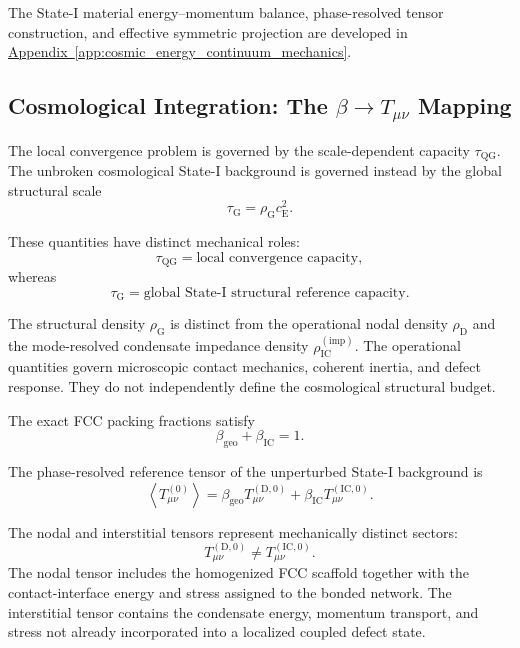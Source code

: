 The State-I material energy--momentum balance, phase-resolved tensor construction, and effective symmetric projection are developed in \hyperref[app:cosmic_energy_continuum_mechanics]{Appendix~\ref*{app:cosmic_energy_continuum_mechanics}}.

\subsection{Cosmological Integration: The \texorpdfstring{$\beta\rightarrow T_{\mu\nu}$}{beta->T\_mu\_nu} Mapping}
\label{sec:cosmological_integration}
The local convergence problem is governed by the scale-dependent capacity $\tau_{\mathrm{QG}}$. The unbroken cosmological State-I background is governed instead by the global structural scale
\begin{equation}
    \tau_{\mathrm{G}} = \rho_{\mathrm{G}}c_{\mathrm{E}}^2.
\end{equation}

These quantities have distinct mechanical roles:
\begin{equation}
    \tau_{\mathrm{QG}} = \text{local convergence capacity},
\end{equation}
whereas
\begin{equation}
    \tau_{\mathrm{G}} = \text{global State-I structural reference capacity}.
\end{equation}

The structural density $\rho_{\mathrm{G}}$ is distinct from the operational nodal density $\rho_{\mathrm{D}}$ and the mode-resolved condensate impedance density $\rho_{\mathrm{IC}}^{(\mathrm{imp})}$. The operational quantities govern microscopic contact mechanics, coherent inertia, and defect response. They do not independently define the cosmological structural budget.

The exact FCC packing fractions satisfy
\begin{equation}
    \beta_{\mathrm{geo}} + \beta_{\mathrm{IC}} = 1.
\end{equation}

The phase-resolved reference tensor of the unperturbed State-I background is
\begin{equation}
    \left\langle T_{\mu\nu}^{(0)} \right\rangle = \beta_{\mathrm{geo}} T_{\mu\nu}^{(\mathrm{D},0)} + \beta_{\mathrm{IC}} T_{\mu\nu}^{(\mathrm{IC},0)}.
\end{equation}

The nodal and interstitial tensors represent mechanically distinct sectors:
\begin{equation}
    T_{\mu\nu}^{(\mathrm{D},0)} \neq T_{\mu\nu}^{(\mathrm{IC},0)}.
\end{equation}
The nodal tensor includes the homogenized FCC scaffold together with the contact-interface energy and stress assigned to the bonded network. The interstitial tensor contains the condensate energy, momentum transport, and stress not already incorporated into a localized coupled defect state.

